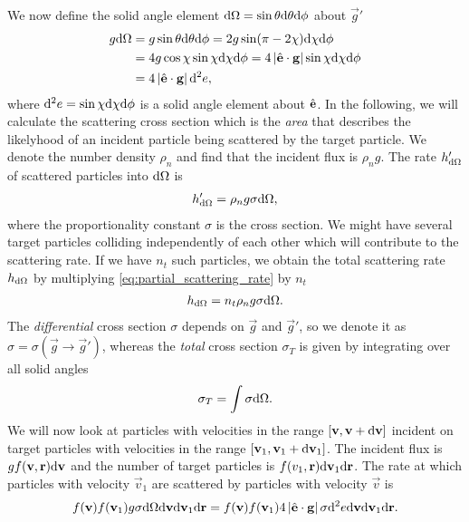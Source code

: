 We now define the solid angle element $\mathrm{d}\Omega=\sin\theta \mathrm{d}\theta \mathrm{d}\phi$ about $\vec g'$ 
\begin{align}
	g \mathrm{d}\Omega &= g\sin\theta \mathrm{d}\theta \mathrm{d}\phi = 2g\sin(\pi - 2\chi)\mathrm{d}\chi \mathrm{d}\phi\\
	&= 4g\cos\chi\sin\chi \mathrm{d}\chi \mathrm{d}\phi = 4\left|\hat {\mathbf{e}}\cdot\mathbf g\right|\sin\chi \mathrm{d}\chi \mathrm{d}\phi\\
	&= 4\left|\hat {\mathbf{e}}\cdot\mathbf g\right|\mathrm{d}^2e,
\end{align}
where $\mathrm{d}^2e = \sin\chi \mathrm{d}\chi \mathrm{d}\phi$ is a solid angle element about $\hat {\mathbf{e}}$. In the following, we will calculate the scattering cross section which is the \textit{area} that describes the likelyhood of an incident particle being scattered by the target particle. We denote the number density $\rho_n$ and find that the incident flux is $\rho_n g$. The rate $h_{\mathrm{d}\Omega}'$ of scattered particles into $\mathrm{d}\Omega$ is
\begin{align}
	\label{eq:partial_scattering_rate}
	h_{\mathrm{d}\Omega}' = \rho_n g\sigma \mathrm{d}\Omega,
\end{align}
where the proportionality constant $\sigma$ is the cross section. We might have several target particles colliding independently of each other which will contribute to the scattering rate. If we have $n_t$ such particles, we obtain the total scattering rate $h_{\mathrm{d}\Omega}$ by multiplying \eqref{eq:partial_scattering_rate} by $n_t$
\begin{align}
	h_{\mathrm{d}\Omega} = n_t\rho_n g\sigma \mathrm{d}\Omega.
\end{align}
The \textit{differential} cross section $\sigma$ depends on $\vec g$ and $\vec g'$, so we denote it as $\sigma = \sigma(\vec g\rightarrow \vec g')$, whereas the \textit{total} cross section $\sigma_T$ is given by integrating over all solid angles
\begin{align}
	\sigma_T = \int \sigma \mathrm{d}\Omega.
\end{align}
We will now look at particles with velocities in the range $[\mathbf v, \mathbf v + \mathrm{d}\mathbf v]$ incident on target particles with velocities in the range $[\mathbf v_1, \mathbf v_1 + \mathrm{d}\mathbf v_1]$. The incident flux is $gf(\mathbf v,\mathbf r)\mathrm{d}\mathbf v$ and the number of target particles is $f(v_1,\mathbf r)\mathrm{d}\mathbf v_1\mathrm{d}\mathbf r$. The rate at which particles with velocity $\vec v_1$ are scattered by particles with velocity $\vec v$ is 
\begin{align}
	f(\mathbf v)f(\mathbf v_1) g \sigma \mathrm{d}\Omega \mathrm{d}\mathbf v \mathrm{d}\mathbf v_1 \mathrm{d}\mathbf r = f(\mathbf v)f(\mathbf v_1)4\left|\hat {\mathbf{e}}\cdot \mathbf g\right| \sigma \mathrm{d}^2e \mathrm{d}\mathbf v \mathrm{d}\mathbf v_1 \mathrm{d}\mathbf r.
\end{align}
